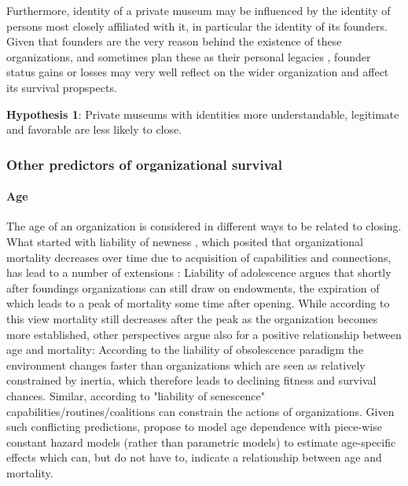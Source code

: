 \documentclass[12pt]{article}
\begin{document}
Furthermore, identity of a private museum may be influenced by the identity of persons most closely affiliated with it, in particular the identity of its founders.
Given that founders are the very reason behind the existence of these organizations, and sometimes plan these as their personal legacies \parencite{Walker_2019_collector}, founder status gains or losses may very well reflect on the wider organization and affect its survival propspects.


\bigbreak
\noindent
\textbf{Hypothesis 1}: Private museums with identities more understandable, legitimate and favorable are less likely to close. 


\subsubsection*{Other predictors of organizational survival}


\paragraph*{Age}



The age of an organization is considered in different ways to be related to closing.
What started with liability of newness \parencite{Stinchcombe_1965_structure}, which posited that organizational mortality decreases over time due to acquisition of capabilities and connections, has lead to a number of extensions \parencite{Carroll_Khessina_2019_demography,Hannan_1998_mortality}:
Liability of adolescence argues that shortly after foundings organizations can still draw on endowments, the expiration of which leads to a peak of mortality some time after opening.
While according to this view mortality still decreases after the peak as the organization becomes more established, other perspectives argue also for a positive relationship between age and mortality:
According to the liability of obsolescence paradigm the environment changes faster than organizations which are seen as relatively constrained by inertia, which therefore leads to declining fitness and survival chances.
Similar, according to "liability of senescence" capabilities/routines/coalitions can constrain the actions of organizations.
Given such conflicting predictions, \textcite{Carroll_Khessina_2019_demography} propose to model age dependence with piece-wise constant hazard models (rather than parametric models) to estimate age-specific effects which can, but do not have to, indicate a relationship between age and mortality.
\end{document}

